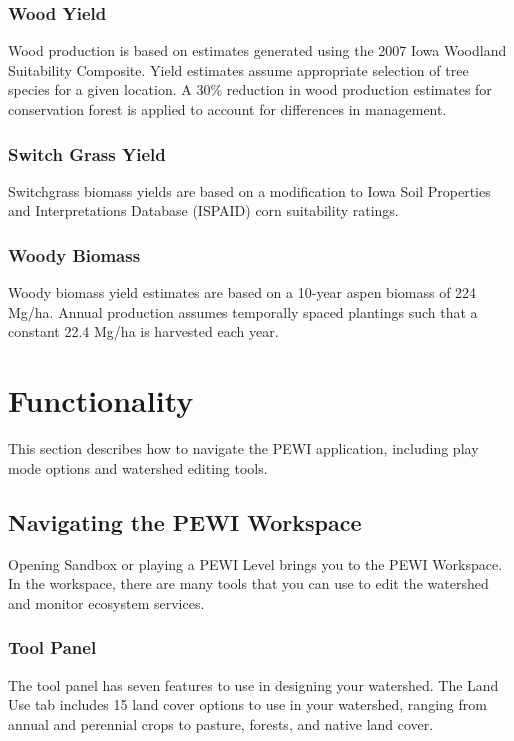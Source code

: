 \documentclass[11pt]{article}
\begin{document}
\begin{itemize}
\subsubsection{Wood Yield}
Wood production is based on estimates generated using the 2007 Iowa Woodland Suitability Composite.\cite{44} Yield estimates assume appropriate selection of tree species for a given location. A 30\% reduction in wood production estimates for conservation forest is applied to account for differences in management.

\subsubsection{Switch Grass Yield}
Switchgrass biomass yields are based on a modification to Iowa Soil Properties and Interpretations Database (ISPAID) corn suitability ratings.\cite{45}

\subsubsection{Woody Biomass}
Woody biomass yield estimates are based on a 10-year aspen biomass of 224 Mg/ha.\cite{46}  Annual production assumes temporally spaced plantings such that a constant 22.4 Mg/ha is harvested each year.

\newpage

\section{Functionality}
This section describes how to navigate the PEWI application, including play mode options and watershed editing tools.

\subsection{Navigating the PEWI Workspace}
Opening Sandbox or playing a PEWI Level brings you to the PEWI Workspace. In the workspace, there are many tools that you can use to edit the watershed and monitor ecosystem services.

\subsubsection{Tool Panel}
The tool panel has seven features to use in designing your watershed. The Land Use tab includes 15 land cover options to use in your watershed, ranging from annual and perennial crops to pasture, forests, and native land cover.


\end{itemize}
\end{document}
